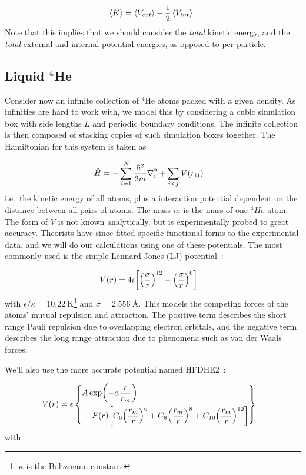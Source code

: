 \documentclass[Thesis.tex]{subfiles}
\begin{document}
\begin{align}
    \expval{K} = \expval{V_{ext}} -
    \frac{1}{2}\expval{V_{int}}.\label{eq:virial-result}
\end{align}
Note that this implies that we should consider the \emph{total} kinetic
energy, and the \emph{total} external and internal potential energies, as opposed to per
particle.


\subsection{Liquid $^4$He}
\label{sec:liquid-helium-theory}

Consider now an infinite collection of $^4$He atoms packed with a given density.
As infinities are hard to work with, we model this by considering a cubic
simulation box with side lengths $L$ and periodic boundary conditions. The
infinite collection is then composed of stacking copies of such simulation boxes
together. The Hamiltonian for this system is taken as

\begin{align}
    \hat H &= -\sum_{i=1}^N \frac{\hbar^2}{2m}\laplacian_i + \sum_{i < j} V(r_{ij})
\end{align}
i.e.\ the kinetic energy of all atoms, plus a interaction potential dependent on
the distance between all pairs of atoms. The mass $m$ is the mass of one $^4He$
atom. The form of $V$ is not known analytically, but is experimentally probed to
great accuracy. Theorists have since fitted specific functional forms to the
experimental data, and we will do our calculations using one of these
potentials. The most commonly used is the simple Lennard-Jones (LJ)
potential~\cite{Kalos-1981}:

\begin{align}
    \label{eq:Lennard-Jones-def}
    V(r)
     &= 4\epsilon\qty[\qty( \frac{\sigma}{r} )^{12} - \qty( \frac{\sigma}{r} )^6 ]
\end{align}
with $\epsilon/\kappa = \SI{10.22}{\K}$\footnote{$\kappa$ is the Boltzmann constant.} and $\sigma = \SI{2.556}{\angstrom}$. This
models the competing forces of the atoms' mutual repulsion and attraction. The
positive term describes the short range Pauli repulsion due to overlapping
electron orbitals, and the negative term describes the long range attraction
due to phenomena such as van der Waals forces.

We'll also use the more accurate potential named HFDHE2~\cite{Kalos-1981}:

\begin{align}
    \label{eq:HFDHE2-def}
    V(r) &= \epsilon
    \left\{\!\begin{aligned}
        &A \exp(-\alpha \frac{r }{ r_m})\\
        &- F(r) \qty[ C_6  \qty(\frac{r_m }{ r})^6 + C_8  \qty(\frac{r_m }{ r})^8 + C_{10} \qty(\frac{r_m }{ r})^{10}]
    \end{aligned}\right\}
\end{align}
with
\end{document}
